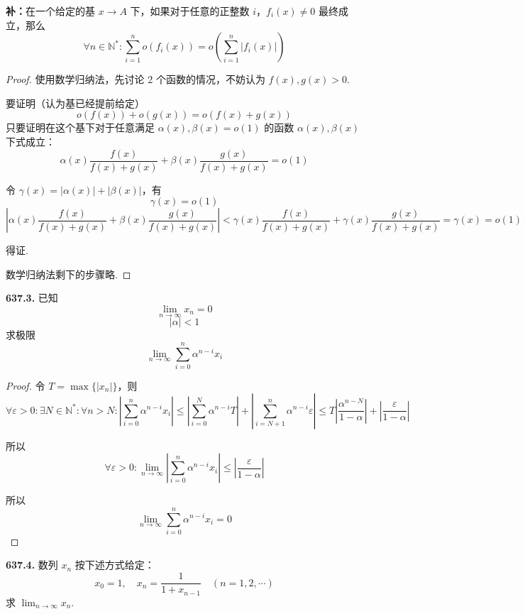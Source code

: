 \textbf{补：}在一个给定的基 $x \rightarrow A$ 下，如果对于任意的正整数 $i$，$f_i(x) \neq 0$ 最终成立，那么
\[\forall n \in \mathbb{N}^*: \sum_{i=1}^{n} o(f_i(x)) = o\left(\sum_{i=1}^{n} \lvert f_i(x)\rvert\right)\]
\begin{proof}
    使用数学归纳法，先讨论 2 个函数的情况，不妨认为 $f(x), g(x) > 0$.
    
    要证明（认为基已经提前给定）
    \[o(f(x)) + o(g(x)) = o(f(x) + g(x))\]
    只要证明在这个基下对于任意满足 $\alpha(x), \beta(x) = o(1)$ 的函数 $\alpha(x), \beta(x)$ 下式成立：
    \[\alpha(x) \frac{f(x)}{f(x) + g(x)} + \beta(x) \frac{g(x)}{f(x) + g(x)} = o(1)\]

    令 $\gamma(x) = \lvert\alpha(x)\rvert + \lvert\beta(x)\rvert$，有
    \[\gamma(x) = o(1)\]
    \[\left|\alpha(x) \frac{f(x)}{f(x) + g(x)} + \beta(x) \frac{g(x)}{f(x) + g(x)}\right| < \gamma(x) \frac{f(x)}{f(x) + g(x)} + \gamma(x) \frac{g(x)}{f(x) + g(x)} = \gamma(x) = o(1)\]
    
    得证.

    数学归纳法剩下的步骤略.
\end{proof}\vspace{9pt}

\textbf{637.3.} 已知
\[\lim_{n \rightarrow \infty} x_n = 0\]
\[\lvert \alpha\rvert < 1\]
求极限
\[\lim_{n \rightarrow \infty} \sum_{i=0}^{n} \alpha^{n-i} x_i\]

\begin{proof}
    令 $T = \max\{\lvert x_n\rvert\}$，则
    \[\forall \varepsilon > 0: \exists N \in \mathbb{N}^*: \forall n > N: \left| \sum_{i=0}^{n} \alpha^{n-i} x_i\right| \leqslant \left| \sum_{i=0}^{N} \alpha^{n-i}T\right| + \left| \sum_{i=N+1}^{n} \alpha^{n-i} \varepsilon \right| \leqslant T \left|\frac{\alpha^{n-N}}{1 - \alpha}\right| + \left|\frac{\varepsilon}{1 - \alpha}\right|\]

    所以
    \[\forall \varepsilon > 0: \lim_{n \rightarrow \infty} \left| \sum_{i=0}^{n} \alpha^{n-i} x_i\right| \leqslant \left| \frac{\varepsilon}{1 - \alpha}\right|\]

    所以
    \[\lim_{n \rightarrow \infty} \sum_{i=0}^{n} \alpha^{n-i} x_i = 0\]
\end{proof}\vspace{9pt}

\textbf{637.4.} 数列 $x_n$ 按下述方式给定：
\[x_0 = 1, \quad x_n = \frac{1}{1 + x_{n-1}} \quad (n = 1,2,\cdots)\]
求 $\displaystyle \lim_{n \rightarrow \infty} x_n$.

